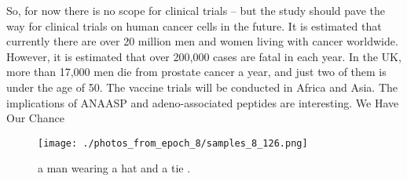 \documentclass{article}%
\begin{document}
So, for now there is no scope for clinical trials – but the study should pave the way for clinical trials on human cancer cells in the future.\newline%
It is estimated that currently there are over 20 million men and women living with cancer worldwide. However, it is estimated that over 200,000 cases are fatal in each year. In the UK, more than 17,000 men die from prostate cancer a year, and just two of them is under the age of 50.\newline%
The vaccine trials will be conducted in Africa and Asia.\newline%
The implications of ANAASP and adeno{-}associated peptides are interesting.\newline%
We Have Our Chance\newline%

%


\begin{figure}[h!]%
\centering%
\texttt{[image: ./photos\_from\_epoch\_8/samples\_8\_126.png]}%
\caption{a man wearing a hat and a tie .}%
\end{figure}

%
\end{document}
